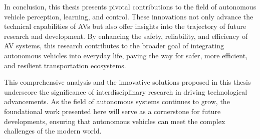In conclusion, this thesis presents pivotal contributions to the field of autonomous vehicle perception, learning, and control. These innovations not only advance the technical capabilities of AVs but also offer insights into the trajectory of future research and development. By enhancing the safety, reliability, and efficiency of AV systems, this research contributes to the broader goal of integrating autonomous vehicles into everyday life, paving the way for safer, more efficient, and resilient transportation ecosystems.

This comprehensive analysis and the innovative solutions proposed in this thesis underscore the significance of interdisciplinary research in driving technological advancements. As the field of autonomous systems continues to grow, the foundational work presented here will serve as a cornerstone for future developments, ensuring that autonomous vehicles can meet the complex challenges of the modern world.



